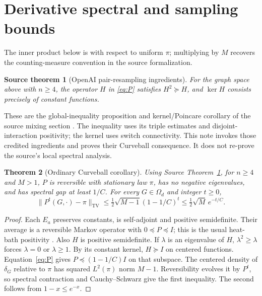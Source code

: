 \documentclass[11pt]{article}
\newtheorem{theorem}{Theorem}
\newtheorem{assumption}[theorem]{Source theorem}
\newcommand{\TV}{\mathrm{TV}}
\newcommand{\Om}{\Omega_d}
\begin{document}
\section{Derivative spectral and sampling bounds}
The inner product below is with respect to uniform $\pi$; multiplying by $M$ recovers the counting-measure convention in the source formalization.

\begin{assumption}[OpenAI pair-resampling ingredients]\label{ass:source}
For the graph space above with $n\ge4$, the operator $H$ in \eqref{eq:P} satisfies $H^2\succeq H$, and $\ker H$ consists precisely of constant functions.
\end{assumption}

These are the global-inequality proposition and kernel/Poincare corollary of the source mixing section \cite{OAI}. The inequality uses its triple estimates and disjoint-interaction positivity; the kernel uses switch connectivity. This note invokes those credited ingredients and proves their Curveball consequence. It does not re-prove the source's local spectral analysis.

\begin{theorem}[Ordinary Curveball corollary]\label{thm:gap}
Using Source Theorem~\ref{ass:source}, for $n\ge4$ and $M>1$, $P$ is reversible with stationary law $\pi$, has no negative eigenvalues, and has spectral gap at least $1/C$. For every $G\in\Om$ and integer $t\ge0$,
\begin{equation}\label{eq:TV}
 \|P^t(G,\cdot)-\pi\|_\TV
 \le\tfrac12\sqrt{M-1}(1-1/C)^t
 \le\tfrac12\sqrt M\,e^{-t/C}.
\end{equation}
\end{theorem}
\begin{proof}
Each $E_a$ preserves constants, is self-adjoint and positive semidefinite. Their average is a reversible Markov operator with $0\preceq P\preceq I$; this is the usual heat-bath positivity \cite{DGU}. Also $H$ is positive semidefinite. If $\lambda$ is an eigenvalue of $H$, $\lambda^2\ge\lambda$ forces $\lambda=0$ or $\lambda\ge1$. By its constant kernel, $H\succeq I$ on centered functions. Equation~\eqref{eq:P} gives $P\preceq(1-1/C)I$ on that subspace. The centered density of $\delta_G$ relative to $\pi$ has squared $L^2(\pi)$ norm $M-1$. Reversibility evolves it by $P^t$, so spectral contraction and Cauchy--Schwarz give the first inequality. The second follows from $1-x\le e^{-x}$.
\end{proof}
\end{document}

